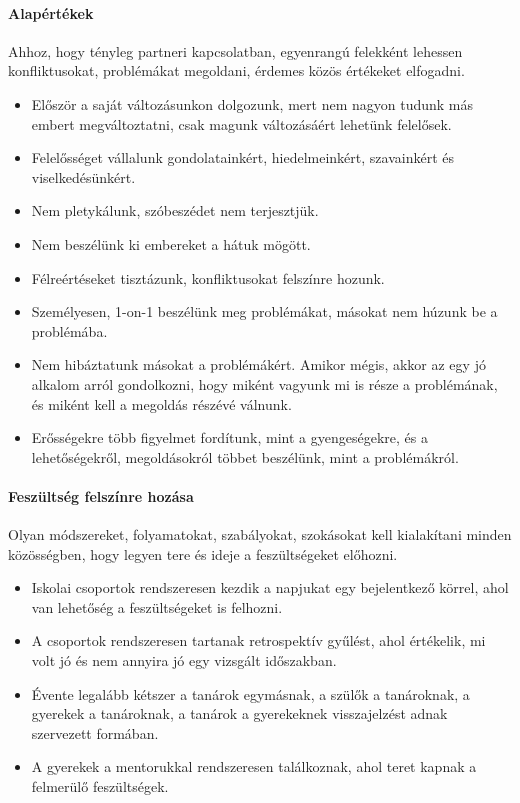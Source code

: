 \paragraph{Alapértékek}
Ahhoz, hogy tényleg partneri kapcsolatban, egyenrangú felekként lehessen konfliktusokat, problémákat megoldani, érdemes közös értékeket elfogadni.
\begin{itemize}
      \item Először a saját változásunkon dolgozunk, mert nem nagyon tudunk más embert megváltoztatni, csak magunk változásáért lehetünk felelősek.
      \item Felelősséget vállalunk gondolatainkért, hiedelmeinkért, szavainkért és viselkedésünkért.
      \item Nem pletykálunk, szóbeszédet nem terjesztjük.
      \item Nem beszélünk ki embereket a hátuk mögött.
      \item Félreértéseket tisztázunk, konfliktusokat felszínre hozunk.
      \item Személyesen, 1-on-1 beszélünk meg problémákat, másokat nem húzunk be a problémába.
      \item Nem hibáztatunk másokat a problémákért. Amikor mégis, akkor az egy jó alkalom arról gondolkozni, hogy miként vagyunk mi is része a problémának, és miként kell a megoldás részévé válnunk.
      \item Erősségekre több figyelmet fordítunk, mint a gyengeségekre, és a lehetőségekről, megoldásokról többet beszélünk, mint a problémákról.
\end{itemize}

\paragraph{Feszültség felszínre hozása}
Olyan módszereket, folyamatokat, szabályokat, szokásokat kell kialakítani minden közösségben, hogy legyen tere és ideje a feszültségeket előhozni.
\begin{itemize}
      \item Iskolai csoportok rendszeresen kezdik a napjukat egy bejelentkező körrel, ahol van lehetőség a feszültségeket is felhozni.
      \item A csoportok rendszeresen tartanak retrospektív gyűlést, ahol értékelik, mi volt jó és nem annyira jó egy vizsgált időszakban.
      \item Évente legalább kétszer a tanárok egymásnak, a szülők a tanároknak, a gyerekek a tanároknak, a tanárok a gyerekeknek visszajelzést adnak szervezett formában.
      \item A gyerekek a mentorukkal rendszeresen találkoznak, ahol teret kapnak a felmerülő feszültségek.
\end{itemize}

